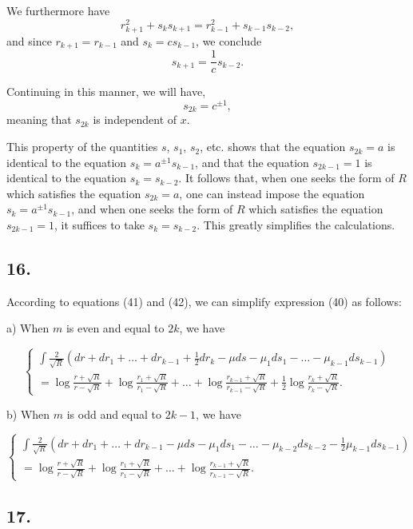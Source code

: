 \documentclass[oneside, 12 pt, leqno]{memoir}
\begin{document}
We furthermore have
\[r_{k+1}^2+s_k s_{k+1}=r_{k-1}^2+s_{k-1} s_{k-2},\]
and since \(r_{k+1}=r_{k-1}\) and \(s_k=c s_{k-1}\), we conclude
\[s_{k+1}=\frac{1}{c} s_{k-2}.\]

Continuing in this manner, we will have,
\[s_{2 k}=c^{ \pm 1},\]
meaning that \(s_{2 k}\) is independent of \(x\).

This property of the quantities \(s\), \(s_1\), \(s_2\), etc. shows that the equation \(s_{2 k}=a\) is identical to the equation \(s_k=a^{ \pm 1} s_{k-1}\), and that the equation \(s_{2 k-1}=1\) is identical to the equation \(s_k=s_{k-2}\). It follows that, when one seeks the form of \(R\) which satisfies the equation \(s_{2 k}=a\), one can instead impose the equation \(s_k=a^{ \pm 1} s_{k-1}\), and when one seeks the form of \(R\) which satisfies the equation \(s_{2 k-1}=1\), it suffices to take \(s_k=s_{k-2}\).  This greatly simplifies the calculations.

\subsection*{16.}

According to equations (41) and (42), we can simplify expression (40) as follows:

\begin{center}a) When \(m\) is even and equal to \(2k\), we have\end{center}
\[\tag{43}\left\{\begin{array}{l}\int \frac{2}{\sqrt{R}}\left(dr+dr_1+\dots+dr_{k-1}+\frac{1}{2}dr_k-\mu ds-\mu_1 ds_1-\dots-\mu_{k-1}ds_{k-1}\right) \\ =\log \frac{r+\sqrt{R}}{r-\sqrt{R}}+\log \frac{r_1+\sqrt{R}}{r_1-\sqrt{R}}+\dots+\log \frac{r_{k-1}+\sqrt{R}}{r_{k-1}-\sqrt{R}}+\frac{1}{2}\log \frac{r_k+\sqrt{R}}{r_k-\sqrt{R}}.\end{array}\right.\]
\begin{center} b) When \(m\) is odd and equal to \(2k-1\), we have \end{center}
\[\tag{44} \left\{\begin{array}{c}\int \frac{2}{\sqrt{R}}\left(dr+dr_1+\dots+dr_{k-1}-\mu ds-\mu_1 ds_1-\dots-\mu_{k-2}ds_{k-2}-\frac{1}{2}\mu_{k-1}ds_{k-1}\right) \\ =\log \frac{r+\sqrt{R}}{r-\sqrt{R}}+\log \frac{r_1+\sqrt{R}}{r_1-\sqrt{R}}+\dots+\log \frac{r_{k-1}+\sqrt{R}}{r_{k-1}-\sqrt{R}}.\end{array}\right.\]

\subsection*{17.}
\end{document}
